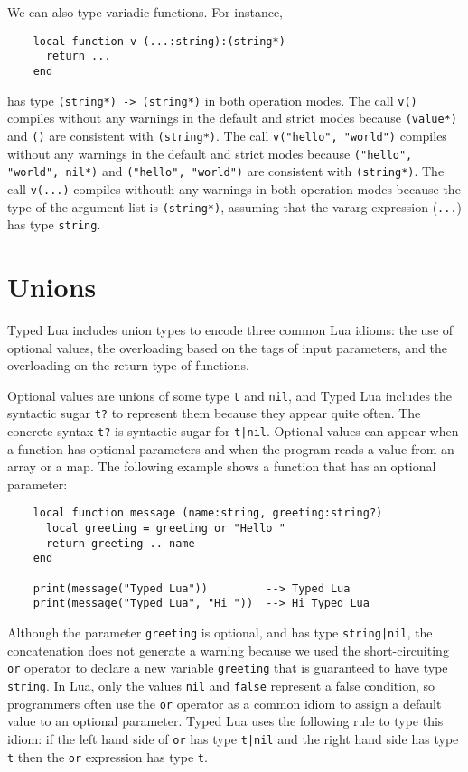 We can also type variadic functions.
For instance,
\begin{verbatim}
    local function v (...:string):(string*)
      return ...
    end
\end{verbatim}
has type \texttt{(string*) -> (string*)} in both operation modes.
The call \texttt{v()} compiles without any warnings in the default and
strict modes because \texttt{(value*)} and \texttt{()} are consistent
with \texttt{(string*)}.
The call \texttt{v("hello", "world")} compiles without any warnings
in the default and strict modes because \texttt{("hello", "world", nil*)}
and \texttt{("hello", "world")} are consistent with \texttt{(string*)}.
The call \texttt{v(...)} compiles withouth any warnings in both
operation modes because the type of the argument list is \texttt{(string*)},
assuming that the vararg expression (\texttt{...}) has type \texttt{string}.

\section{Unions}
\label{sec:unions}

Typed Lua includes union types to encode three common Lua idioms:
the use of optional values, the overloading based on the tags of
input parameters, and the overloading on the return type of functions.

Optional values are unions of some type \texttt{t} and \texttt{nil},
and Typed Lua includes the syntactic sugar \texttt{t?} to represent
them because they appear quite often.
The concrete syntax \texttt{t?} is syntactic sugar for \texttt{t|nil}.
Optional values can appear when a function has optional parameters
and when the program reads a value from an array or a map.
The following example shows a function that has an optional parameter:
\begin{verbatim}
    local function message (name:string, greeting:string?)
      local greeting = greeting or "Hello "
      return greeting .. name
    end

    print(message("Typed Lua"))         --> Typed Lua
    print(message("Typed Lua", "Hi "))  --> Hi Typed Lua
\end{verbatim}

Although the parameter \texttt{greeting} is optional, and has type
\texttt{string|nil}, the concatenation does not generate a warning
because we used the short-circuiting \texttt{or} operator to declare a
new variable \texttt{greeting} that is guaranteed to have type \texttt{string}. 
In Lua, only the values \texttt{nil} and \texttt{false} represent a
false condition, so programmers often use the \texttt{or} operator as a
common idiom to assign a default value to an optional parameter. 
Typed Lua uses the following rule to type this idiom: 
if the left hand side of \texttt{or} has type \texttt{t|nil} and
the right hand side has type \texttt{t} then the \texttt{or} expression has
type \texttt{t}.


